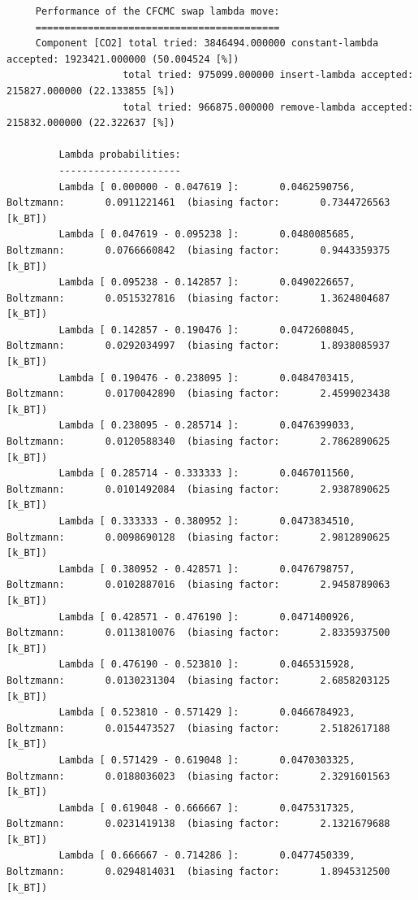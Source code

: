 \begin{tiny}
\begin{verbatim}
     Performance of the CFCMC swap lambda move:
     ==========================================
     Component [CO2] total tried: 3846494.000000 constant-lambda accepted: 1923421.000000 (50.004524 [%])
                    total tried: 975099.000000 insert-lambda accepted: 215827.000000 (22.133855 [%])
                    total tried: 966875.000000 remove-lambda accepted: 215832.000000 (22.322637 [%])
     
         Lambda probabilities:
         ---------------------
         Lambda [ 0.000000 - 0.047619 ]:       0.0462590756, Boltzmann:       0.0911221461  (biasing factor:       0.7344726563 [k_BT])
         Lambda [ 0.047619 - 0.095238 ]:       0.0480085685, Boltzmann:       0.0766660842  (biasing factor:       0.9443359375 [k_BT])
         Lambda [ 0.095238 - 0.142857 ]:       0.0490226657, Boltzmann:       0.0515327816  (biasing factor:       1.3624804687 [k_BT])
         Lambda [ 0.142857 - 0.190476 ]:       0.0472608045, Boltzmann:       0.0292034997  (biasing factor:       1.8938085937 [k_BT])
         Lambda [ 0.190476 - 0.238095 ]:       0.0484703415, Boltzmann:       0.0170042890  (biasing factor:       2.4599023438 [k_BT])
         Lambda [ 0.238095 - 0.285714 ]:       0.0476399033, Boltzmann:       0.0120588340  (biasing factor:       2.7862890625 [k_BT])
         Lambda [ 0.285714 - 0.333333 ]:       0.0467011560, Boltzmann:       0.0101492084  (biasing factor:       2.9387890625 [k_BT])
         Lambda [ 0.333333 - 0.380952 ]:       0.0473834510, Boltzmann:       0.0098690128  (biasing factor:       2.9812890625 [k_BT])
         Lambda [ 0.380952 - 0.428571 ]:       0.0476798757, Boltzmann:       0.0102887016  (biasing factor:       2.9458789063 [k_BT])
         Lambda [ 0.428571 - 0.476190 ]:       0.0471400926, Boltzmann:       0.0113810076  (biasing factor:       2.8335937500 [k_BT])
         Lambda [ 0.476190 - 0.523810 ]:       0.0465315928, Boltzmann:       0.0130231304  (biasing factor:       2.6858203125 [k_BT])
         Lambda [ 0.523810 - 0.571429 ]:       0.0466784923, Boltzmann:       0.0154473527  (biasing factor:       2.5182617188 [k_BT])
         Lambda [ 0.571429 - 0.619048 ]:       0.0470303325, Boltzmann:       0.0188036023  (biasing factor:       2.3291601563 [k_BT])
         Lambda [ 0.619048 - 0.666667 ]:       0.0475317325, Boltzmann:       0.0231419138  (biasing factor:       2.1321679688 [k_BT])
         Lambda [ 0.666667 - 0.714286 ]:       0.0477450339, Boltzmann:       0.0294814031  (biasing factor:       1.8945312500 [k_BT])

\end{verbatim}
\end{tiny}
